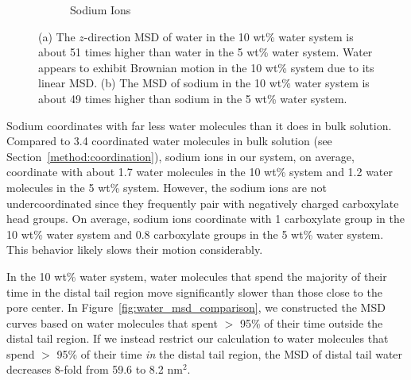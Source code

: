 \documentclass[journal=jpcbfk,manuscript=article]{achemso}
\begin{document}
\begin{figure}[!htb]
\begin{subfigure}{0.45\textwidth}
  \caption{Sodium Ions}\label{fig:na_msd_comparison}
  \end{subfigure}
  \caption{(a) The $z$-direction MSD of water in the 10 wt\% water system 
  is about 51 times higher than water in the 5 wt\% water system. Water 
  appears to exhibit Brownian motion in the 10 wt\% system due to its
  linear MSD. (b) The MSD of sodium in the 10 wt\% water system is about 
  49 times higher than sodium in the 5 wt\% water system.}\label{fig:msd_comparison}
  \end{figure}
  
  Sodium coordinates with far less water molecules than it does in bulk solution.
  Compared to 3.4 coordinated water molecules in bulk solution (see 
  Section~\ref{method:coordination}), sodium ions in our system, on average,
  coordinate with about 1.7 water molecules in the 10 wt\% system and 1.2 water
  molecules in the 5 wt\% system. However, the sodium ions are not undercoordinated
  since they frequently pair with negatively charged carboxylate head groups.
  On average, sodium ions coordinate with 1 carboxylate group in the 10 wt\% water
  system and 0.8 carboxylate groups in the 5 wt\% water system. This behavior likely
  slows their motion considerably.

  In the 10 wt\% water system, water molecules that spend the majority of 
  their time in the distal tail region move significantly slower than those
  close to the pore center. In Figure~\ref{fig:water_msd_comparison}, we 
  constructed the MSD curves based on water molecules that spent $>$ 95\% of their
  time outside the distal tail region. If we instead restrict our calculation to
  water molecules that spend $>$ 95\% of their time \textit{in} the distal tail region, 
  the MSD of distal tail water decreases 8-fold from 59.6 to 8.2 nm$^2$. 
  
\end{document}
